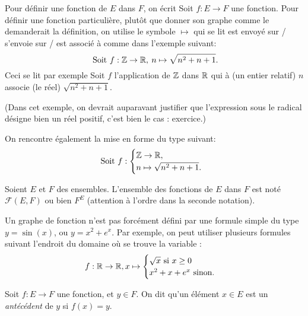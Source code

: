 Pour définir une fonction de $E$ dans $F$, on écrit \og Soit $f : E\to F$ une fonction\fg. Pour définir une fonction particulière, plutôt que donner son graphe comme le demanderait la définition, on utilise le symbole \og$\mapsto$\fg{} qui se lit \og est envoyé sur / s'envoie sur / est associé à \fg{} comme dans l'exemple suivant:
\[
\text{ Soit } f :\mathbb{Z} \to \mathbb{R},\: n\mapsto \sqrt{n^2+n+1}.
\]
Ceci se lit par exemple \og Soit $f$ l'application de $\mathbb{Z}$ dans $\mathbb{R}$ qui à (un entier relatif) $n$ associe (le réel) $\sqrt{n^2+n+1}$\fg.


(Dans cet exemple, on devrait auparavant justifier que l'expression sous le radical désigne bien un réel positif, c'est bien le cas : exercice.)

On rencontre également la mise en forme du type suivant:
\[
\text{ Soit } f :\begin{cases}\mathbb{Z} \to \mathbb{R},\\ n\mapsto \sqrt{n^2+n+1}.\end{cases}
\]
\begin{definition}
Soient $E$ et $F$ des ensembles. L'ensemble des fonctions de $E$ dans $F$ est noté $\mathcal F(E,F)$ ou bien $F^E$ (attention à l'ordre dans la seconde notation).
\end{definition}

\begin{remarque}
Un graphe de fonction n'est pas forcément défini par une formule simple du type $y=\sin(x)$, ou $y=x^2+e^x$. Par exemple, on peut utiliser plusieurs formules suivant l'endroit du domaine où se trouve la variable :
\[ f: 
\mathbb{R} \to \mathbb{R}, 
x\mapsto \begin{cases}\sqrt{x}\text{ si }x\geq 0\\ x^2+x+e^x\text{ sinon.}\end{cases}\]
\end{remarque}

\begin{definition}
Soit $f : E\to F$ une fonction, et $y\in F$. On dit qu'un élément $x\in E$ est un \emph{antécédent} de $y$ si $f(x)=y$.
\end{definition}

